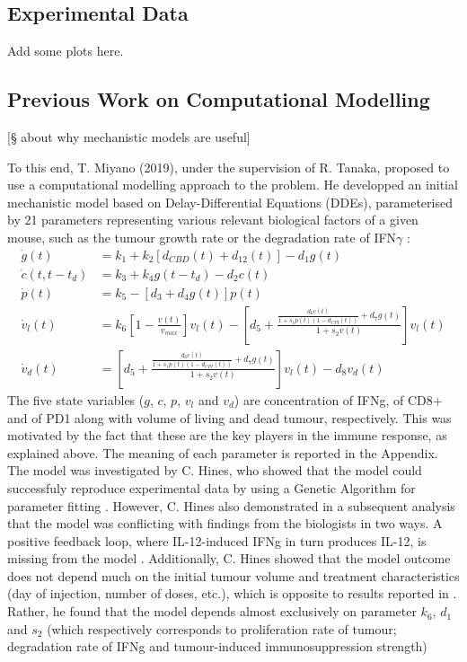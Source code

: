 \documentclass[11pt]{article}
\begin{document}
\subsection{Experimental Data}
Add some plots here.
\subsection{Previous Work on Computational Modelling}
[§ about why mechanistic models are useful]
\par To this end, T. Miyano (2019), under the supervision of R. Tanaka, proposed to use a computational modelling approach to the problem. He developped an initial mechanistic model based on Delay-Differential Equations (DDEs), parameterised by 21 parameters representing various relevant biological factors of a given mouse, such as the tumour growth rate or the degradation rate of IFN$\gamma$ \cite{takuya}: 
\begin{align*}
    \dot{g}(t) &= k_1 + k_2 [d_{CBD}(t) + d_{12}(t)] - d_1g(t) \\ 
    \dot{c}(t,t-t_d) &= k_3 + k_4g(t-t_d)-d_2c(t) \\ 
    \dot{p}(t) &= k_5 - [d_3 + d_4g(t)]p(t) \\ 
    \dot{v}_l(t) &= k_6\left[1 - \frac{v(t)}{v_{max}} \right]v_l(t) - \left[d_5 + \frac{\frac{d_6c(t)}{1+s_1p(t)(1-d_{CPI}(t))}+d_7g(t)}{1+s_2v(t)}\right]v_l(t)\\
    \dot{v}_d(t) &= \left[d_5 + \frac{\frac{d_6c(t)}{1+s_1p(t)(1-d_{CPI}(t))}+d_7g(t)}{1+s_2v(t)}\right]v_l(t) - d_8 v_d(t)
\end{align*}
The five state variables ($g$, $c$, $p$, $v_l$ and $v_d$) are concentration of IFNg, of CD8+ and of PD1 along with volume of living and dead tumour, respectively. This was motivated by the fact that these are the key players in the immune response, as explained above. The meaning of each parameter is reported in the Appendix. The model was investigated by C. Hines, who showed that the model could successfuly reproduce experimental data by using a Genetic Algorithm for parameter fitting \cite{christian1}. However, C. Hines also demonstrated in a subsequent analysis that the model was conflicting with findings from the biologists in two ways. A positive feedback loop, where IL-12-induced IFNg in turn produces IL-12, is missing from the model \cite{christian2}. Additionally, C. Hines showed that the model outcome does not depend much on the initial tumour volume and treatment characteristics (day of injection, number of doses, etc.)\cite{christian1}, which is opposite to results reported in \cite{cbdil12}. Rather, he found that the model depends almost exclusively on parameter $k_6$, $d_1$ and $s_2$ (which respectively corresponds to proliferation rate of tumour; degradation rate of IFNg and tumour-induced immunosuppression strength)
\end{document}
